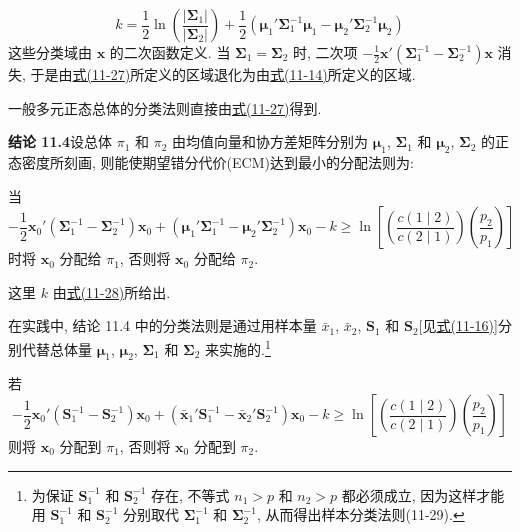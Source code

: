 
\label{eq:11-28}
\begin{equation}
k=\frac{1}{2}\ln\left(\frac{|\boldsymbol{\Sigma}_1|}{|\boldsymbol{\Sigma}_2|}\right)+\frac{1}{2}(\boldsymbol{\mu}_1'\boldsymbol{\Sigma}_1^{-1}\boldsymbol{\mu}_1-\boldsymbol{\mu}_2'\boldsymbol{\Sigma}_2^{-1}\boldsymbol{\mu}_2)
\tag{11-28}
\end{equation}
这些分类域由 $\mathbf{x}$ 的二次函数定义. 当 $\boldsymbol{\Sigma}_1=\boldsymbol{\Sigma}_2$ 时, 二次项 $-\frac{1}{2}\mathbf{x}'(\boldsymbol{\Sigma}_1^{-1}-\boldsymbol{\Sigma}_2^{-1})\mathbf{x}$ 消失, 于是由\hyperref[eq:11-27]{式(11-27)}所定义的区域退化为由\hyperref[eq:11-14]{式(11-14)}所定义的区域.

一般多元正态总体的分类法则直接由\hyperref[eq:11-27]{式(11-27)}得到.

\noindent\textbf{结论 11.4}\quad 设总体 $\pi_1$ 和 $\pi_2$ 由均值向量和协方差矩阵分别为 $\boldsymbol{\mu}_1$, $\boldsymbol{\Sigma}_1$ 和 $\boldsymbol{\mu}_2$, $\boldsymbol{\Sigma}_2$ 的正态密度所刻画, 则能使期望错分代价(ECM)达到最小的分配法则为:

当
\[
-\frac{1}{2}\mathbf{x}_0'(\boldsymbol{\Sigma}_1^{-1}-\boldsymbol{\Sigma}_2^{-1})\mathbf{x}_0+(\boldsymbol{\mu}_1'\boldsymbol{\Sigma}_1^{-1}-\boldsymbol{\mu}_2'\boldsymbol{\Sigma}_2^{-1})\mathbf{x}_0-k\geqslant\ln\left[\left(\frac{c(1\mid2)}{c(2\mid1)}\right)\left(\frac{p_2}{p_1}\right)\right]
\]
时将 $\mathbf{x}_0$ 分配给 $\pi_1$, 否则将 $\mathbf{x}_0$ 分配给 $\pi_2$.

这里 $k$ 由\hyperref[eq:11-28]{式(11-28)}所给出.

在实践中, 结论 11.4 中的分类法则是通过用样本量 $\bar{x}_1$, $\bar{x}_2$, $\mathbf{S}_1$ 和 $\mathbf{S}_2$[见\hyperref[eq:11-16]{式(11-16)}]分别代替总体量 $\boldsymbol{\mu}_1$, $\boldsymbol{\mu}_2$, $\boldsymbol{\Sigma}_1$ 和 $\boldsymbol{\Sigma}_2$ 来实施的.\footnote{为保证 $\mathbf{S}_1^{-1}$ 和 $\mathbf{S}_2^{-1}$ 存在, 不等式 $n_1>p$ 和 $n_2>p$ 都必须成立, 因为这样才能用 $\mathbf{S}_1^{-1}$ 和 $\mathbf{S}_2^{-1}$ 分别取代 $\boldsymbol{\Sigma}_1^{-1}$ 和 $\boldsymbol{\Sigma}_2^{-1}$, 从而得出样本分类法则(11-29).}

\begin{mvframe}
若
\label{eq:11-29}
\begin{equation}
-\frac{1}{2}\mathbf{x}_0'(\mathbf{S}_1^{-1}-\mathbf{S}_2^{-1})\mathbf{x}_0+(\bar{\mathbf{x}}_1'\mathbf{S}_1^{-1}-\bar{\mathbf{x}}_2'\mathbf{S}_2^{-1})\mathbf{x}_0-k\geqslant\ln\left[\left(\frac{c(1\mid2)}{c(2\mid1)}\right)\left(\frac{p_2}{p_1}\right)\right]
\tag{11-29}
\end{equation}
则将 $\mathbf{x}_0$ 分配到 $\pi_1$, 否则将 $\mathbf{x}_0$ 分配到 $\pi_2$.
\end{mvframe}


